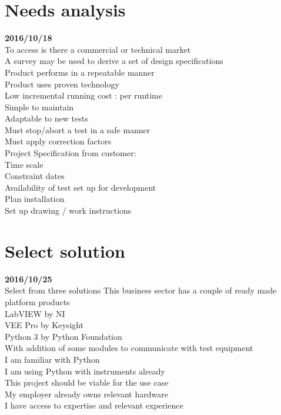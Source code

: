 \section{Needs analysis}\textbf{2016/10/18}\\
To access is there a commercial or technical market\\
A survey may be used to derive a set of design specifications\\
Product performs in a repeatable manner\\
Product uses proven technology\\
Low incremental running cost : per runtime\\
Simple to maintain\\
Adaptable to new tests\\
Must stop/abort a test in a safe manner\\
Must apply correction factors\\

Project Specification from customer:\\
Time scale\\
Constraint dates\\
Availability of test set up for development\\
Plan installation\\
Set up drawing / work instructions\\

\section{Select solution}\textbf{2016/10/25}\\
Select from three solutions
This business sector has a couple of ready made platform products\\
LabVIEW by NI\\
VEE Pro by Keysight\\
Python 3 by Python Foundation\\
  With addition of some modules to communicate with test equipment\\

I am familiar with Python\\
I am using Python with instruments  already\\
This project should be viable for the use case\\
My employer already owns relevant hardware\\
I have access to expertise and relevant experience\\

